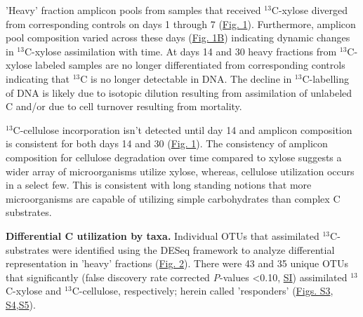 'Heavy' fraction amplicon pools from samples that received
$^{13}$C-xylose diverged from corresponding controls on days 1
through 7
(\href{https://www.authorea.com/users/3537/articles/3612/master/file/figures/ordination_all1/ordination_all1.png}{Fig.
1}). Furthermore, amplicon pool composition varied across these days
(\href{https://www.authorea.com/users/3537/articles/3612/master/file/figures/ordination_all1/ordination_all1.png}{Fig.
1B}) indicating dynamic changes in $^{13}$C-xylose assimilation
with time. At days 14 and 30 heavy fractions from $^{13}$C-xylose
labeled samples are no longer differentiated from corresponding controls
indicating that $^{13}$C is no longer detectable in DNA. The
decline in $^{13}$C-labelling of DNA is likely due to isotopic
dilution resulting from assimilation of unlabeled C and/or due to cell turnover
resulting from mortality. 

$^{13}$C-cellulose incorporation isn't detected until day 14 and
amplicon composition is consistent for both days 14 and 30
(\href{https://www.authorea.com/users/3537/articles/3612/master/file/figures/ordination_all1/ordination_all1.png}{Fig.
1}). The consistency of amplicon composition for cellulose degradation over
time compared to xylose suggests a wider array of microorganisms utilize
xylose, whereas, cellulose utilization occurs in a select few. This is
consistent with long standing notions that more microorganisms are capable of
utilizing simple carbohydrates than complex C substrates. 



\textbf{Differential C utilization by taxa.} Individual OTUs that assimilated
$^{13}$C-substrates were identified using the DESeq framework
\citep{Anders_Huber_2010} to analyze differential representation in 'heavy'
fractions
(\href{https://www.authorea.com/users/3537/articles/3612/master/file/figures/l2fc_fig1/l2fc_fig.pdf}{Fig.
2}). There were 43 and 35 unique OTUs that significantly (false discovery rate
corrected \textit{P}-values \textless 0.10,
\href{https://authorea.com/users/3537/articles/8459/_show_article}{SI})
assimilated $^{13}$C-xylose and $^{13}$C-cellulose,
respectively; herein called 'responders'
(\href{https://www.authorea.com/users/3537/articles/8459/master/file/figures/OTU_screening_schematic/OTU_screening_schematic.pdf}{Figs.
S3},
\href{https://www.authorea.com/users/3537/articles/8459/master/file/figures/l2fc_fig_pVal/l2fc_fig_pVal.png}{S4},\href{https://authorea.com/users/3537/articles/8459/master/file/figures/manhattan/manhattan.png}{S5}).






